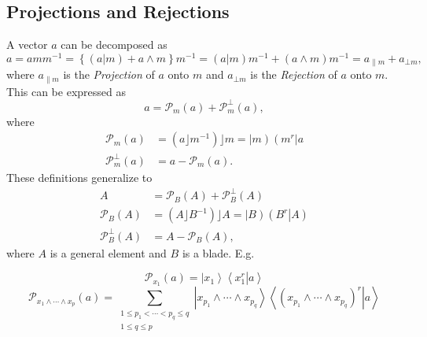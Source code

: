 \documentclass[aps,preprint]{revtex4}%
\begin{document}
\subsection{Projections and Rejections}

A vector $a$ can be decomposed as
\begin{equation}
a=amm^{-1}=\left\{  \left(  a\left\vert m\right.  \right)  +a\wedge m\right\}
m^{-1}=\left(  a\left\vert m\right.  \right)  m^{-1}+\left(  a\wedge m\right)
m^{-1}=a_{\parallel m}+a_{\bot m},
\end{equation}
where $a_{\parallel m}$ is the \emph{Projection} of $a$ onto $m$ and $a_{\bot
m}$ is the \emph{Rejection} of $a$ onto $m.$ This can be expressed as
\begin{equation}
a=\mathcal{P}_{m}\left(  a\right)  +\mathcal{P}_{m}^{\bot}\left(  a\right)  ,
\end{equation}
where
\begin{align}
\mathcal{P}_{m}\left(  a\right)   &  =\left(  a\rfloor m^{-1}\right)  \rfloor
m=\left\vert m\right)  \left(  m^{r}\right\vert a\\
\mathcal{P}_{m}^{\bot}\left(  a\right)   &  =a-\mathcal{P}_{m}\left(
a\right)  .
\end{align}
These definitions generalize to
\begin{align}
A  &  =\mathcal{P}_{B}\left(  A\right)  +\mathcal{P}_{B}^{\bot}\left(
A\right) \\
\mathcal{P}_{B}\left(  A\right)   &  =\left(  A\rfloor B^{-1}\right)  \rfloor
A=\left\vert B\right)  \left(  \left.  B^{r}\right\vert A\right) \\
\mathcal{P}_{B}^{\bot}\left(  A\right)   &  =A-\mathcal{P}_{B}\left(
A\right)  ,
\end{align}
where $A$ is a general element and $B$ is a blade. E.g.%

\begin{equation}
\mathcal{P}_{x_{1}}\left(  a\right)  =\left\vert x_{1}\right\rangle
\left\langle \left.  x_{1}^{r}\right\vert a\right\rangle
\end{equation}%
\begin{equation}
\mathcal{P}_{x_{1}\wedge\cdots\wedge x_{p}}\left(  a\right)  =\sum
_{\substack{1\leq p_{1}<\cdots<p_{q}\leq q\\1\leq q\leq p}}\left\vert
x_{p_{1}}\wedge\cdots\wedge x_{p_{q}}\right\rangle \left\langle \left.
\left(  x_{p_{1}}\wedge\cdots\wedge x_{p_{q}}\right)  ^{r}\right\vert
a\right\rangle
\end{equation}
\end{document}
